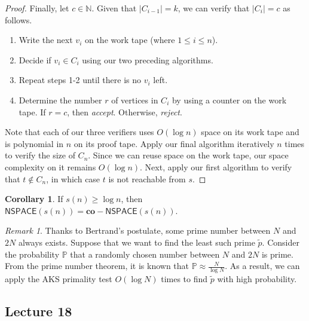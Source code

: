 \documentclass[10pt,letterpaper,cm]{nupset}
\theoremstyle{definition}
\theoremstyle{theorem}
\newtheorem{corollary}[definition]{Corollary}
\theoremstyle{remark}
\newtheorem{remark}[definition]{Remark}
\newcommand{\N}{\mathbb N}
\newcommand{\1}{\mathbf{1}}
\newcommand{\0}{\vec 0}
\begin{document}
\begin{proof}
\smallskip

Finally, let $c\in \N$. Given that $\left\lvert{C_{i-1}}\right\rvert=k$, we can verify that $\left\lvert{C_i}\right\rvert = c$ as follows. 
\begin{enumerate} 
\item Write the next $v_i$ on the work tape (where $1\leq i \leq n$). 
\item Decide if $v_i \in C_i$ using our two preceding algorithms.
\item Repeat steps 1-2 until there is no $v_i$ left.
\item Determine the number $r$ of vertices in $C_i$ by using a counter on the work tape. If $r = c$, then \textit{accept}. Otherwise, \textit{reject}.
\end{enumerate}

Note that each of our three verifiers uses $O(\log{n})$ space on its work tape and  is polynomial in $n$ on its proof tape. Apply our final algorithm iteratively $n$ times to verify the size of  $C_n$. Since we can reuse space on the work tape, our space complexity on it remains $O(\log{n})$.  Next, apply our first algorithm to verify that $t\notin C_n$, in which case $t$ is not reachable from $s$.
\end{proof}

\begin{corollary}
If $s(n) \geq \log{n}$, then $\mathsf{NSPACE}(s(n)) = \mathbf{co}{-}\mathsf{NSPACE}(s(n))$.
\end{corollary}

\bigskip

\begin{remark}
Thanks to Bertrand's postulate, some prime number between $N$ and $2N$ always exists.  Suppose that we want to find the least such prime $\tilde{p}$. Consider the probability $\mathbb{P}$ that a randomly chosen number between $N$ and $2N$ is prime. From the prime number theorem, it is known that $\mathbb{P} \approx \frac{N}{\log{N}}$. As a result, we can apply the AKS primality test $O(\log{N})$ times to find $\tilde{p}$ with high probability.
\end{remark}

\subsection{Lecture 18}
\end{document}
